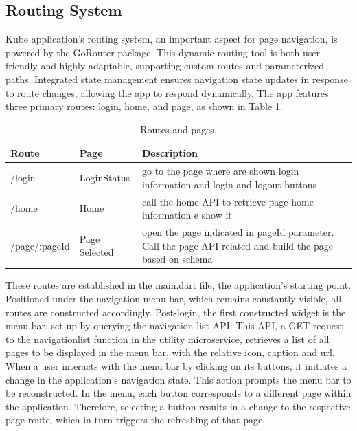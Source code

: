 \subsection{Routing System}
Kube application's routing system, an important aspect for page navigation, is powered by the
GoRouter package. This dynamic routing tool is both user-friendly and highly adaptable, supporting
custom routes and parameterized paths. Integrated state management ensures navigation state updates
in response to route changes, allowing the app to respond dynamically. The app features three
primary routes: login, home, and page, as shown in Table \ref{tab:5_routes}.

\begin{table}
    \centering
    \begin{tabular}{|l|l|m{7cm}|}
        \hline
        \textbf{Route} & \textbf{Page} & \textbf{Description}                                                                                      \\ \hline
        /login         & LoginStatus   & go to the page where are shown login information and login and logout buttons                             \\ \hline
        /home          & Home          & call the home API to retrieve page home information e show it                                             \\ \hline
        /page/:pageId  & Page Selected & open the page indicated in pageId parameter. Call the page API related and build the page based on schema \\ \hline
    \end{tabular}
    \caption{Routes and pages.}
    \label{tab:5_routes}
\end{table}

These routes are established in the main.dart file, the application's starting point. Positioned
under the navigation menu bar, which remains constantly visible, all routes are constructed
accordingly. Post-login, the first constructed widget is the menu bar, set up by querying the
navigation list API. This API, a GET request to the navigationlist function in the utility
microservice, retrieves a list of all pages to be displayed in the menu bar, with the relative icon,
caption and url. When a user interacts with the menu bar by clicking on its buttons, it initiates a
change in the application's navigation state. This action prompts the menu bar to be reconstructed.
In the menu, each button corresponds to a different page within the application. Therefore,
selecting a button results in a change to the respective page route, which in turn triggers the
refreshing of that page.

